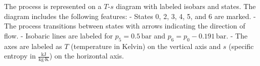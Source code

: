 The process is represented on a \( T \)-\( s \) diagram with labeled isobars and states. The diagram includes the following features:  
- States 0, 2, 3, 4, 5, and 6 are marked.  
- The process transitions between states with arrows indicating the direction of flow.  
- Isobaric lines are labeled for \( p_5 = 0.5 \, \text{bar} \) and \( p_6 = p_0 - 0.191 \, \text{bar} \).  
- The axes are labeled as \( T \) (temperature in Kelvin) on the vertical axis and \( s \) (specific entropy in \( \frac{\text{kJ}}{\text{kg·K}} \)) on the horizontal axis.